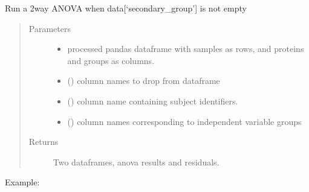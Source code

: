 \documentclass[letterpaper,10pt,english]{sphinxmanual}
\begin{document}
\begin{fulllineitems}
\label{\detokenize{_autosummary/analytics_core.analytics:analytics_core.analytics.analytics.run_two_way_anova}}
Run a 2\sphinxhyphen{}way ANOVA when data{[}‘secondary\_group’{]} is not empty
\begin{quote}\begin{description}
\item[{Parameters}] \leavevmode\begin{itemize}
\item {} 
 \textendash{} processed pandas dataframe with samples as rows, and proteins and groups as columns.

\item {} 
 () \textendash{} column names to drop from dataframe

\item {} 
 () \textendash{} column name containing subject identifiers.

\item {} 
 () \textendash{} column names corresponding to independent variable groups

\end{itemize}

\item[{Returns}] \leavevmode
Two dataframes, anova results and residuals.

\end{description}\end{quote}

Example:

\begin{sphinxVerbatim}[commandchars=\\\{\}]
   \PYG{p}{[}\PYG{p}{]}  \PYG{p}{[} \PYG{p}{]}
\end{sphinxVerbatim}


\end{fulllineitems}
\end{document}
